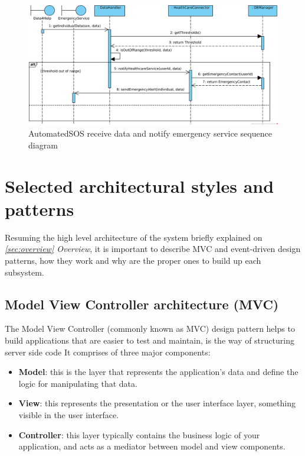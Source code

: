 \documentclass[a4paper, hidelinks, 12pt]{report}
\begin{document}
	\begin{figure}[H]
		\centering
		\includegraphics[width=1\textwidth]{diagrams/sequence_diagrams/asos_receive_individual_data_and_notify_emergency_service.png}
		\caption[AutomatedSOS receive data and notify emergency service sequence diagram]{AutomatedSOS receive data and notify emergency service sequence diagram}
		\label{fig:asos_seq_receive_data}
	\end{figure}
	
	\section{Selected architectural styles and patterns}
Resuming the high level architecture of the system briefly explained on \textit{ \autoref{sec:overview} Overview}, it is important to describe MVC	and event-driven design patterns, how they work and why are the proper ones to build up each subsystem.

	\subsection{Model View Controller architecture (MVC)}
	The Model View Controller (commonly known as MVC) design pattern helps  to build applications that are easier to test and maintain, is the way of structuring server side code 
	It comprises of three major components:
	
	\begin{itemize}
	\item {\textbf{Model}}: this is the layer that represents the application's data and define the logic for manipulating that data.
	\item {\textbf{View}}: this represents the presentation or the user interface layer, something visible in the user interface.
	\item{\textbf{Controller}}: this layer typically contains the business logic of your application, and acts as a mediator between model and view components.
	\end{itemize}
\end{document}

